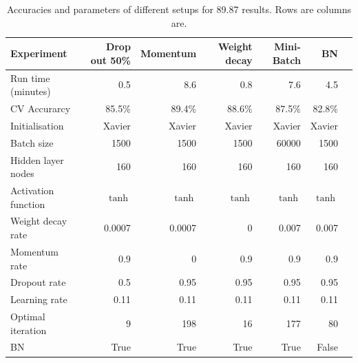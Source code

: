 \begin{table}
\caption{Accuracies and parameters of different setups for 89.87 results. Rows are columns are.\label{tb:comp}}
{\footnotesize \centering
\begin{tabular}{@{}lrrrrrr@{}}
\toprule
Experiment                  & Drop out 50\% & Momentum & Weight decay & Mini-Batch & BN \\ \midrule
Run time (minutes)             & 0.5        & 8.6          & 0.8      & 7.6 & 4.5          \\
CV Accurarcy                   & 85.5\%     & 89.4\%       & 88.6\%   & 87.5\% &82.8\%       \\
Initialisation              & Xavier     & Xavier       & Xavier   & Xavier & Xavier        \\
Batch size                   & 1500       & 1500         & 1500     & 60000    & 1500        \\
Hidden layer nodes        & 160        & 160          & 160      & 160    & 160         \\
Activation function        & $\tanh$    & $\tanh$      & $\tanh$  & $\tanh$  & $\tanh$       \\
Weight decay rate          & 0.0007     & 0.0007       & 0        & 0.007  & 0.007        \\
Momentum rate                & 0.9        & 0            & 0.9      & 0.9    & 0.9         \\
Dropout rate                & 0.5        & 0.95         & 0.95     & 0.95    & 0.95        \\
Learning rate                & 0.11       & 0.11         & 0.11     & 0.11    & 0.11       \\
Optimal iteration       & 9          & 198          & 16       & 177     & 80       \\ 
BN       & True          & True          & True       & True     & False       \\ \bottomrule
\end{tabular}
}
\end{table}


